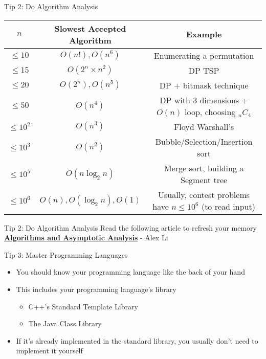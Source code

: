\documentclass[10pt]{beamer}
\newcommand{\bi}{\begin{itemize}}
\newcommand{\ei}{\end{itemize}}
\begin{document}
\begin{frame}{Tip 2: Do Algorithm Analysis}
    \vspace{10pt}
{
    \scriptsize
    \begin{center}
    \begin{tabular}{c|c|c}
        $n$ & Slowest Accepted Algorithm & Example \\
        \hline
        $\leq 10$ & $O(n!), O(n^6)$ & Enumerating a permutation \\
        $\leq 15$ & $O(2^n\times n^2)$ & DP TSP \\
        $\leq 20$ & $O(2^n), O(n^5)$ & DP + bitmask technique \\
        $\leq 50$ & $O(n^4)$ & DP with 3 dimensions + $O(n)$ loop, choosing  $_nC_4$ \\
        $\leq 10^2$ & $O(n^3)$ & Floyd Warshall's \\
        $\leq 10^3$ & $O(n^2)$ & Bubble/Selection/Insertion sort \\
        $\leq 10^5$ & $O(n\log_2{n})$ & Merge sort, building a Segment tree \\
        $\leq 10^6$ & $O(n), O(\log_2{n}), O(1)$ & Usually, contest problems have $n\leq10^6$ (to read input) \\
    \end{tabular}
    \end{center}
}
\end{frame}

\begin{frame}{Tip 2: Do Algorithm Analysis}
    Read the following article to refresh your memory \\ \textbf{\href{https://drive.google.com/drive/folders/0By8UVgxe29XaT2FYT2lDdzFGcHc}{Algorithms and Asymptotic Analysis}} - Alex Li \\
\end{frame}

\begin{frame}{Tip 3: Master Programming Languages}
    \bi
        \item You should know your programming language like the back of your hand
        \item This includes your programming language's library
            \bi
                \item C++'s Standard Template Library
                \item The Java Class Library
            \ei
        \item If it's already implemented in the standard library, you usually don't need to implement it yourself
    \ei
\end{frame}
\end{document}

